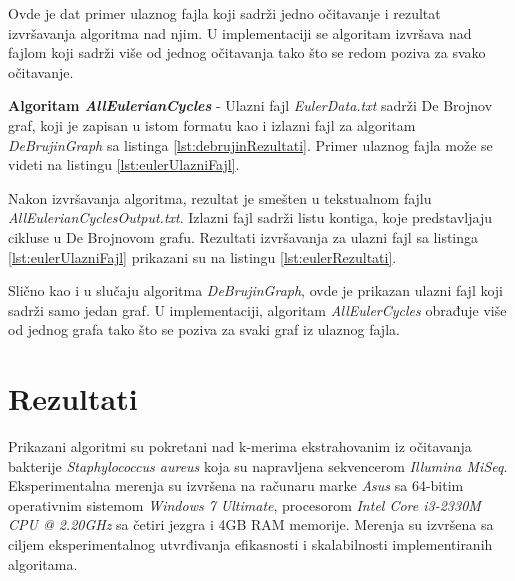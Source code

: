 \documentclass[12pt,oneside]{memoir}
\begin{document}


Ovde je dat primer ulaznog fajla koji sadrži jedno očitavanje i rezultat izvršavanja algoritma nad njim. U implementaciji se algoritam izvršava nad fajlom koji sadrži više od jednog očitavanja tako što se redom poziva za svako očitavanje.

\textbf{Algoritam \textit{AllEulerianCycles}} - Ulazni fajl \textit{EulerData.txt} sadrži De Brojnov
graf, koji je zapisan u istom formatu kao i izlazni fajl za algoritam \textit{DeBrujinGraph} sa listinga \ref{lst:debrujinRezultati}.  Primer ulaznog fajla može se videti na listingu \ref{lst:eulerUlazniFajl}.



Nakon izvršavanja algoritma, rezultat je smešten u tekstualnom fajlu \textit{AllEulerianCyclesOutput.txt}. Izlazni fajl sadrži listu kontiga, koje predstavljaju cikluse u De Brojnovom grafu. Rezultati izvršavanja za ulazni fajl sa listinga \ref{lst:eulerUlazniFajl} prikazani su na listingu \ref{lst:eulerRezultati}.



Slično kao i u slučaju algoritma \textit{DeBrujinGraph}, ovde je prikazan ulazni fajl koji sadrži samo jedan graf. U implementaciji, algoritam \textit{AllEulerCycles} obrađuje više od jednog grafa tako što se poziva za svaki graf iz ulaznog fajla.

\section{Rezultati}
\label{odeljak:Rezultati}

Prikazani algoritmi su pokretani nad k-merima ekstrahovanim iz očitavanja bakterije \textit{Staphylococcus aureus} koja su napravljena sekvencerom \textit{Illumina MiSeq}. Eksperimentalna merenja su izvršena na računaru marke \textit{Asus} sa 64-bitim operativnim sistemom \textit{Windows 7 Ultimate}, procesorom \textit{Intel Core i3-2330M CPU @ 2.20GHz} sa četiri jezgra i 4GB RAM memorije. Merenja su izvršena sa ciljem eksperimentalnog utvrđivanja efikasnosti i skalabilnosti implementiranih algoritama.
\end{document}
